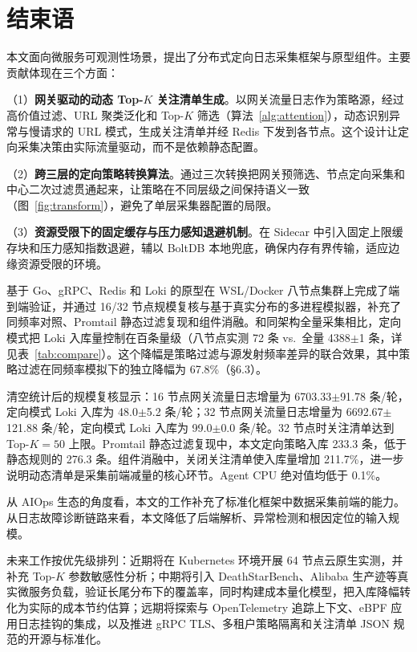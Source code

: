 \section{结束语}

本文面向微服务可观测性场景，提出了分布式定向日志采集框架与原型组件。主要贡献体现在三个方面：

（1）\textbf{网关驱动的动态 Top-$K$ 关注清单生成}。以网关流量日志作为策略源，经过高价值过滤、URL 聚类泛化和 Top-$K$ 筛选（算法~\ref{alg:attention}），动态识别异常与慢请求的 URL 模式，生成关注清单并经 Redis 下发到各节点。这个设计让定向采集决策由实际流量驱动，而不是依赖静态配置。

（2）\textbf{跨三层的定向策略转换算法}。通过三次转换把网关预筛选、节点定向采集和中心二次过滤贯通起来，让策略在不同层级之间保持语义一致（图~\ref{fig:transform}），避免了单层采集器配置的局限。

（3）\textbf{资源受限下的固定缓存与压力感知退避机制}。在 Sidecar 中引入固定上限缓存块和压力感知指数退避，辅以 BoltDB 本地兜底，确保内存有界传输，适应边缘资源受限的环境。

基于 Go、gRPC、Redis 和 Loki 的原型在 WSL/Docker 八节点集群上完成了端到端验证，并通过 16/32 节点规模复核与基于真实分布的多进程模拟器，补充了同频率对照、Promtail 静态过滤复现和组件消融。和同架构全量采集相比，定向模式把 Loki 入库量控制在百条量级（八节点实测 72 条 vs.\ 全量 4388$\pm$1 条，详见表~\ref{tab:compare}）。这个降幅是策略过滤与源发射频率差异的联合效果，其中策略过滤在同频率模拟下的独立降幅为 67.8\%（§6.3）。

清空统计后的规模复核显示：16 节点网关流量日志增量为 6703.33$\pm$91.78 条/轮，定向模式 Loki 入库为 48.0$\pm$5.2 条/轮；32 节点网关流量日志增量为 6692.67$\pm$121.88 条/轮，定向模式 Loki 入库为 99.0$\pm$0.0 条/轮。32 节点时关注清单达到 Top-$K{=}50$ 上限。Promtail 静态过滤复现中，本文定向策略入库 233.3 条，低于静态规则的 276.3 条。组件消融中，关闭关注清单使入库量增加 211.7\%，进一步说明动态清单是采集前端减量的核心环节。Agent CPU 绝对值均低于 0.1\%。

从 AIOps 生态的角度看，本文的工作补充了标准化框架中数据采集前端的能力。从日志故障诊断链路来看，本文降低了后端解析、异常检测和根因定位的输入规模。

未来工作按优先级排列：近期将在 Kubernetes 环境开展 64 节点云原生实测，并补充 Top-$K$ 参数敏感性分析；中期将引入 DeathStarBench、Alibaba 生产迹等真实微服务负载，验证长尾分布下的覆盖率，同时构建成本量化模型，把入库降幅转化为实际的成本节约估算；远期将探索与 OpenTelemetry 追踪上下文、eBPF 应用日志挂钩的集成，以及推进 gRPC TLS、多租户策略隔离和关注清单 JSON 规范的开源与标准化。
